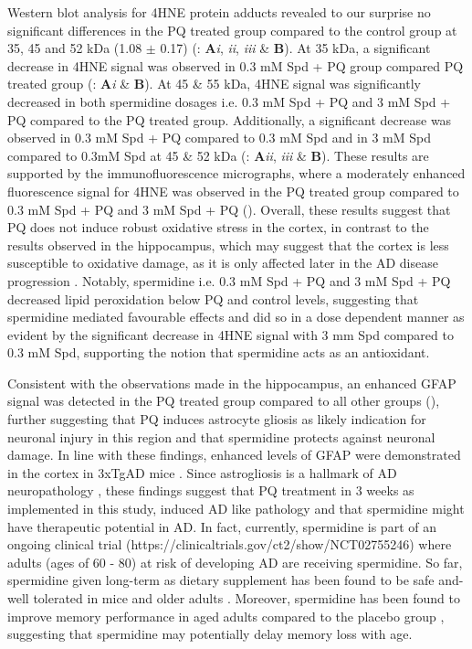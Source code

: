 Western blot analysis for 4HNE protein adducts revealed to our surprise no significant differences in the PQ treated group compared to the control group at 35, 45 and 52 kDa (1.08 $\pm$ 0.17) (: \textbf{A}\textit{i}, \textit{ii}, \textit{iii} \& \textbf{B}). At 35 kDa, a significant decrease in 4HNE signal was observed in 0.3 mM Spd + PQ group compared PQ treated group (: \textbf{A}\textit{i} \& \textbf{B}). At 45 \& 55 kDa, 4HNE signal was significantly decreased in both spermidine dosages i.e. 0.3 mM Spd + PQ and 3 mM Spd + PQ compared to the PQ treated group. Additionally, a significant decrease was observed in 0.3 mM Spd + PQ compared to 0.3 mM Spd and in 3 mM Spd compared to 0.3mM Spd at 45 \& 52 kDa (: \textbf{A}\textit{ii}, \textit{iii} \& \textbf{B}). These results are supported by the immunofluorescence micrographs, where a moderately enhanced fluorescence signal for 4HNE was observed in the PQ treated group compared to 0.3 mM Spd + PQ and 3 mM Spd + PQ (). Overall, these results suggest that PQ does not induce robust oxidative stress in the cortex, in contrast to the results observed in the hippocampus, which may suggest that the cortex is less susceptible to oxidative damage, as it is only affected later in the AD disease progression \citep{lumkwana2017}. Notably, spermidine i.e. 0.3 mM Spd + PQ and 3 mM Spd + PQ decreased lipid peroxidation below PQ and control levels, suggesting that spermidine mediated favourable effects and did so in a dose dependent manner as evident by the significant decrease in 4HNE signal with 3 mm Spd compared to 0.3 mM Spd, supporting the notion that spermidine acts as an antioxidant.

Consistent with the observations made in the hippocampus, an enhanced GFAP signal was detected in the PQ treated group compared to all other groups (), further suggesting that PQ induces astrocyte gliosis as likely indication for neuronal injury in this region and that spermidine protects against neuronal damage. In line with these findings, enhanced levels of GFAP were demonstrated in the cortex in 3xTgAD mice \citep{Kamphuis2014,Oddo2003}. Since astrogliosis is a hallmark of AD neuropathology \citep{Gotz2001,Grundke-Iqbal1989}, these findings suggest that PQ treatment in 3 weeks as implemented in this study, induced AD like pathology and that spermidine might have therapeutic potential in AD. In fact, currently, spermidine is part of an ongoing clinical trial (https://clinicaltrials.gov/ct2/show/NCT02755246) where adults (ages of 60 - 80) at risk of developing AD are receiving spermidine. So far, spermidine given long-term as dietary supplement has been found to be safe and-well tolerated in mice and older adults \citep{Schwarz2018}. Moreover, spermidine has been found to improve memory performance in aged adults compared to the placebo group \citep{Wirth2018}, suggesting that spermidine may potentially delay memory loss with age.


